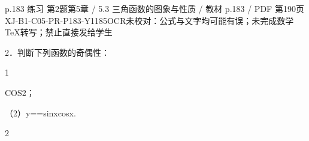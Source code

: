 \begin{bankitem}{p.183 练习 第2题}{第5章 / 5.3 三角函数的图象与性质 / 教材 p.183 / PDF 第190页}{XJ-B1-C05-PR-P183-Y1185}{OCR未校对：公式与文字均可能有误；未完成数学TeX转写；禁止直接发给学生}
\begin{ocrdraft}
\par
2．判断下列函数的奇偶性：
\par
1
\par
COS2；
\par
（2）y==sinxcosx.
\par
2
\end{ocrdraft}
\end{bankitem}
